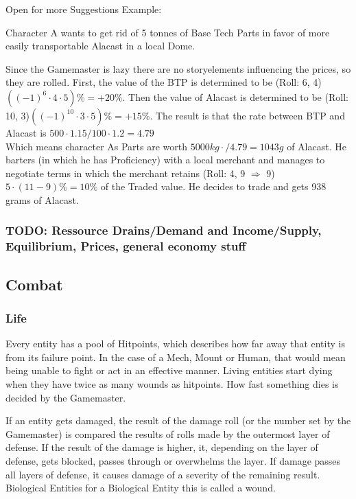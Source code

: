 \documentclass{article}
\begin{document}
    Open for more Suggestions\newline
    \newline
    Example:\par
    Character A wants to get rid of 5 tonnes of Base Tech Parts in favor of more easily transportable Alacast in a local
    Dome.\par
    Since the Gamemaster is lazy there are no storyelements influencing the prices, so they are rolled. First, the value of
    the BTP is determined to be (Roll: 6, 4) \(((-1)^{6}\cdot4\cdot5) \% = +20\%\). Then the value of Alacast is determined
    to be (Roll: 10, 3)\(((-1)^{10}\cdot3\cdot5) \% = +15\%\). The result is that the rate between BTP and Alacast is
    \( 500\cdot1.15/100\cdot1.2 = 4.79\) \\ Which means character As Parts are worth
    \(5000 kg\cdot / 4.79 = 1043 g \) of Alacast. He barters (in which he has Proficiency) with a local merchant and manages to
    negotiate terms in which the merchant retains (Roll: 4, 9 \(\Rightarrow\) 9) \(5\cdot(11-9)\% = 10\%\) of the Traded
    value. He decides to trade and gets 938 grams of Alacast.\newline\newline
    \pagebreak[1]
    \subsubsection{TODO: Ressource Drains/Demand and Income/Supply, Equilibrium, Prices, general economy stuff}
    \subsection{Combat}

    \subsubsection{Life}
    Every entity has a pool of Hitpoints, which describes how far away that entity is from its failure point.
    In the case of a Mech, Mount or Human, that would mean being unable to fight or act in an effective manner. Living
    entities start dying when they have twice as many wounds as hitpoints. How fast something dies is decided by the
    Gamemaster.\par
    If an entity gets damaged, the result of the damage roll (or the number set by the Gamemaster) is compared the results
    of rolls made by the outermost layer of defense. If the result of the damage is higher, it, depending on the
    layer of defense, gets blocked, passes through or overwhelms the layer. If damage passes all layers of defense,
    it causes damage of a severity of the remaining result.
    Biological Entities for a Biological Entity this is called a wound.
\end{document}
